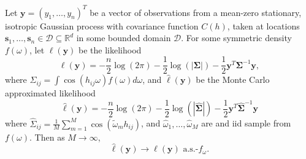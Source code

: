\begin{theorem}
	Let $\bm{y} = (y_1, \dots, y_n)^T$ be a vector of observations from a mean-zero stationary, isotropic Gaussian process with covariance function $C(h)$, taken at locations $\bm{s}_1, \dots, \bm{s}_n \in \mathcal{D} \subseteq \mathbb{R}^d$ in some bounded domain $\mathcal{D}$.  For some symmetric density $f(\omega)$, let $\ell(\bm{y})$ be the likelihood
	\[
		\ell(\bm{y}) = -\frac{n}{2} \log(2\pi) - \frac{1}{2} \log(|\bm{\Sigma}|) - \frac{1}{2} \bm{y}^T \bm{\Sigma}^{-1} \bm{y},
	\]
where $\Sigma_{ij} = \int \cos(h_{ij}\omega)f(\omega)d\omega$, and $\hat{\ell}(\bm{y})$ be the Monte Carlo approximated likelihood
   	\[
 		\hat{\ell}(\bm{y}) = -\frac{n}{2} \log(2\pi) - \frac{1}{2} \log (| \widehat{\bm{\Sigma}}|) - \frac{1}{2} \bm{y}^T \widehat{\bm{\Sigma}}^{-1} \bm{y}
	\] 
where $\widehat{\Sigma}_{ij} = \frac{1}{M} \sum_{m=1}^M \cos(\widetilde{\omega}_m h_{ij})$, and $\widehat{\omega}_1, \dots, \widehat{\omega}_M$ are and iid sample from $f(\omega)$.  Then as $M \to \infty$,
\[
\hat{\ell}(\bm{y}) \to \ell(\bm{y}) \text{ a.s.-}f_\omega.
\]
\end{theorem}


